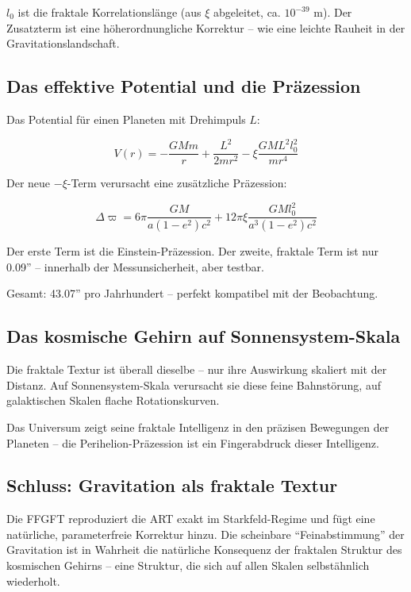 	$l_0$ ist die fraktale Korrelationslänge (aus $\xi$ abgeleitet, ca. $10^{-39}$ m). Der Zusatzterm ist eine höherordnungliche Korrektur – wie eine leichte Rauheit in der Gravitationslandschaft.
	
	\subsection*{Das effektive Potential und die Präzession}
	
	Das Potential für einen Planeten mit Drehimpuls $L$:
	
	\begin{equation}
		V(r) = -\frac{GM m}{r} + \frac{L^2}{2m r^2} - \xi \frac{GM L^2 l_0^2}{m r^4}
	\end{equation}
	
	Der neue $-\xi$-Term verursacht eine zusätzliche Präzession:
	
	\begin{equation}
		\Delta \varpi = 6\pi \frac{GM}{a(1-e^2)c^2} + 12\pi \xi \frac{GM l_0^2}{a^3 (1-e^2) c^2}
	\end{equation}
	
	Der erste Term ist die Einstein-Präzession. Der zweite, fraktale Term ist nur 0.09'' – innerhalb der Messunsicherheit, aber testbar.
	
	Gesamt: 43.07'' pro Jahrhundert – perfekt kompatibel mit der Beobachtung.
	
	\subsection*{Das kosmische Gehirn auf Sonnensystem-Skala}
	
	Die fraktale Textur ist überall dieselbe – nur ihre Auswirkung skaliert mit der Distanz. Auf Sonnensystem-Skala verursacht sie diese feine Bahnstörung, auf galaktischen Skalen flache Rotationskurven.
	
	Das Universum zeigt seine fraktale Intelligenz in den präzisen Bewegungen der Planeten – die Perihelion-Präzession ist ein Fingerabdruck dieser Intelligenz.
	
	\subsection*{Schluss: Gravitation als fraktale Textur}
	
	Die FFGFT reproduziert die ART exakt im Starkfeld-Regime und fügt eine natürliche, parameterfreie Korrektur hinzu. Die scheinbare \enquote{Feinabstimmung} der Gravitation ist in Wahrheit die natürliche Konsequenz der fraktalen Struktur des kosmischen Gehirns – eine Struktur, die sich auf allen Skalen selbstähnlich wiederholt.




